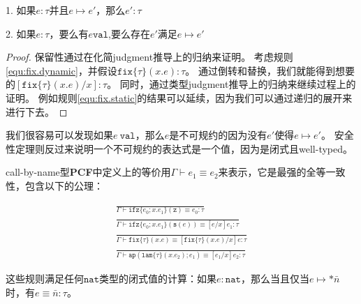 \begin{lemma}[安全性]
\hfil

1. 如果\(e: \tau\)并且\(e \longmapsto e'\)，那么\(e': \tau\)

2. 如果\(e: \tau\)，要么有\(e \mathtt{val}\),要么存在\(e'\)满足\(e \longmapsto e'\)
\end{lemma}

\begin{proof}
	保留性通过在化简\gls{judgment}推导上的归纳来证明。
	考虑规则\ref{equ:fix.dynamic}，并假设\(\mathtt{fix}\{\tau\}(x.e): \tau\)。
	通过倒转和替换，我们就能得到想要的\([\mathtt{fix}\{\tau\}(x.e)/x]: \tau\)。
	同时，通过类型\gls{judgment}推导上的归纳来继续过程上的证明。
	例如规则\ref{equ:fix.static}的结果可以延续，因为我们可以通过递归的展开来进行下去。
\end{proof}


我们很容易可以发现如果\(e\ \mathtt{val}\)，那么\(e\)是不可规约的因为没有\(e'\)使得\(e \longmapsto e'\)。
安全性定理则反过来说明一个不可规约的表达式是一个值，因为是闭式且\gls{well-typed}。

\gls{call-by-name}型\textbf{PCF}中定义上的等价用\(\Gamma \vdash e_1 \equiv e_2\)来表示，它是最强的全等一致性，包含以下的公理：

\begin{gather}
	\frac{}{
		\Gamma \vdash \mathtt{ifz}\{e_0; x.e_1\}(\mathtt{z}) \equiv e_0: \tau
	}
	\tag{19.4a} \\
	\frac{}{
		\Gamma \vdash \mathtt{ifz}\{e_0; x.e_1\}(\mathtt{s}(e)) \equiv [e/x]e_1: \tau
	}
	\tag{19.4b} \\
	\frac{}{
		\Gamma \vdash \mathtt{fix}\{\tau\}(x.e) \equiv [\mathtt{fix}\{\tau\}(x.e)/x]e: \tau
	}
	\tag{19.4c} \\
	\frac{}{
		\Gamma \vdash \mathtt{ap}(\mathtt{lam}\{\tau\}(x.e_2); e_1) \equiv [e_1/x]e_2: \tau
	}
	\tag{19.4d}
\end{gather}

这些规则满足任何\(\mathtt{nat}\)类型的闭式值的计算：如果\(e: \mathtt{nat}\)，那么当且仅当\(e \longmapsto *\bar{n}\)时，有\(e \equiv \bar{n}: \tau\)。